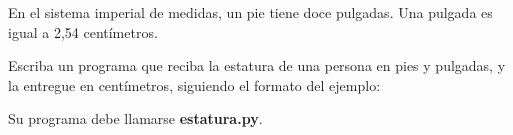 \documentclass[12pt,spanish,letterpaper]{article}
\begin{document}
  En el sistema imperial de medidas,
  un pie tiene doce pulgadas.
  Una pulgada es igual a 2,54 centímetros.

  Escriba un programa
  que reciba la estatura de una persona
  en pies y pulgadas,
  y la entregue en centímetros,
  siguiendo el formato del ejemplo:

  \begin{minipage}[t]{.5\textwidth}
    
  \end{minipage}

  Su programa debe llamarse \textbf{estatura.py}.
\end{document}
